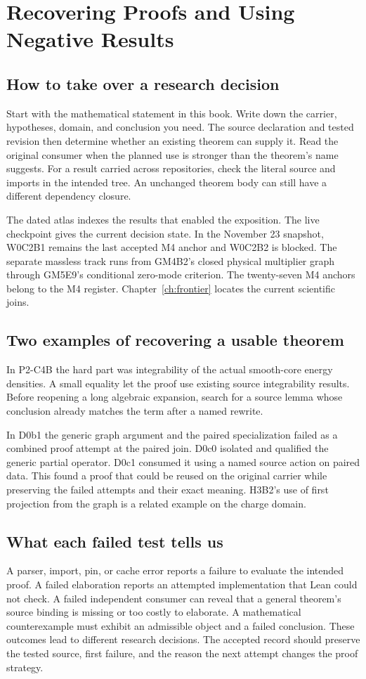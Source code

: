 \chapter{Recovering Proofs and Using Negative Results}
\label{ch:proof-practice}

\section{How to take over a research decision}
Start with the mathematical statement in this book. Write down the
carrier, hypotheses, domain, and conclusion you need. The source
declaration and tested revision then determine whether an existing
theorem can supply it. Read the original consumer when the planned
use is stronger than the theorem's name suggests. For a result
carried across repositories, check the literal source and imports
in the intended tree. An unchanged theorem body can still have a
different dependency closure.

The dated atlas indexes the results that enabled the exposition.
The live checkpoint gives the current decision state. In the November
23 snapshot, W0C2B1 remains the last accepted M4 anchor and W0C2B2 is
blocked. The separate massless track runs from GM4B2's closed physical
multiplier graph through GM5E9's conditional zero-mode criterion.
The twenty-seven M4 anchors belong to the M4 register.
Chapter~\ref{ch:frontier} locates the current scientific joins.

\section{Two examples of recovering a usable theorem}
In P2-C4B the hard part was integrability of the actual smooth-core
energy densities. A small equality let the proof use existing
source integrability results. Before reopening a long algebraic
expansion, search for a source lemma whose conclusion already
matches the term after a named rewrite.

In D0b1 the generic graph argument and the paired specialization
failed as a combined proof attempt at the paired join. D0c0 isolated
and qualified the generic partial operator. D0c1 consumed it using
a named source action on paired data. This found a proof that could
be reused on the original carrier while preserving the failed
attempts and their exact meaning. H3B2's use of first projection
from the graph is a related example on the charge domain.

\section{What each failed test tells us}
A parser, import, pin, or cache error reports a failure to evaluate
the intended proof. A failed elaboration reports an attempted
implementation that Lean could not check. A failed independent
consumer can reveal that a general theorem's source binding is
missing or too costly to elaborate. A mathematical counterexample
must exhibit an admissible object and a failed conclusion. These
outcomes lead to different research decisions. The accepted
record should preserve the tested source, first failure, and the
reason the next attempt changes the proof strategy.

